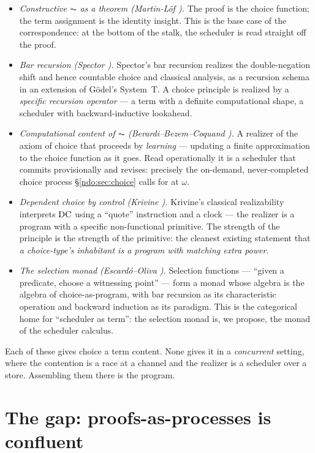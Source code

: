 \begin{itemize}[leftmargin=1.4em]
\item \emph{Constructive $\AC$ as a theorem (Martin-L\"of \cite{martinlof}).} The proof is the
choice function; the term assignment is the identity insight. This is the base case of the
correspondence: at the bottom of the stalk, the scheduler is read straight off the proof.
\item \emph{Bar recursion (Spector \cite{spector}).} Spector's bar recursion realizes the
double-negation shift and hence countable choice and classical analysis, as a recursion schema in an
extension of G\"odel's System~T. A choice principle is realized by a \emph{specific recursion operator}
--- a term with a definite computational shape, a scheduler with backward-inductive lookahead.
\item \emph{Computational content of $\AC$ (Berardi--Bezem--Coquand \cite{bbc}).} A realizer of the
axiom of choice that proceeds by \emph{learning} --- updating a finite approximation to the choice
function as it goes. Read operationally it is a scheduler that commits provisionally and revises:
precisely the on-demand, never-completed choice process \S\ref{ndo:sec:choice} calls for at $\omega$.
\item \emph{Dependent choice by control (Krivine \cite{krivine}).} Krivine's classical realizability
interprets $\mathrm{DC}$ using a ``quote'' instruction and a clock --- the realizer is a program with a
specific non-functional primitive. The strength of the principle is the strength of the primitive:
the cleanest existing statement that \emph{a choice-type's inhabitant is a program with matching
extra power}.
\item \emph{The selection monad (Escard\'o--Oliva \cite{escardo}).} Selection functions ---
``given a predicate, choose a witnessing point'' --- form a monad whose algebra is the algebra of
choice-as-program, with bar recursion as its characteristic operation and backward induction as its
paradigm. This is the categorical home for ``scheduler as term'': the selection monad is, we propose,
the monad of the scheduler calculus.
\end{itemize}

\noindent
Each of these gives choice a term content. None gives it in a \emph{concurrent} setting, where the
contention is a race at a channel and the realizer is a scheduler over a store. Assembling them there
is the program.

\section{The gap: proofs-as-processes is confluent}\label{chs:sec:gap}

